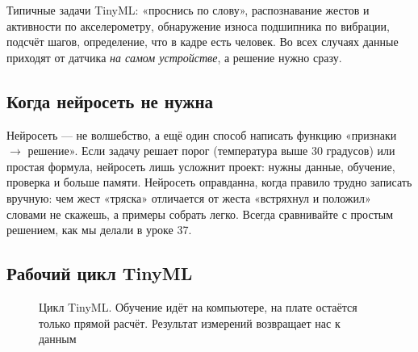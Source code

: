 Типичные задачи TinyML: «проснись по слову», распознавание жестов и активности по акселерометру,
обнаружение износа подшипника по вибрации, подсчёт шагов, определение, что в кадре есть человек.
Во всех случаях данные приходят от датчика \emph{на самом устройстве}, а решение нужно сразу.

\subsection{Когда нейросеть не нужна}

Нейросеть --- не волшебство, а ещё один способ написать функцию «признаки $\to$ решение».
Если задачу решает порог (температура выше 30 градусов) или простая формула, нейросеть лишь
усложнит проект: нужны данные, обучение, проверка и больше памяти. Нейросеть оправданна, когда
правило трудно записать вручную: чем жест «тряска» отличается от жеста «встряхнул и положил»
словами не скажешь, а примеры собрать легко. Всегда сравнивайте с простым решением,
как мы делали в уроке 37.

\subsection{Рабочий цикл TinyML}

\begin{figure}[H]
\centering
{}
\caption{Цикл TinyML. Обучение идёт на компьютере, на плате остаётся только прямой расчёт.
Результат измерений возвращает нас к данным}
\end{figure}

